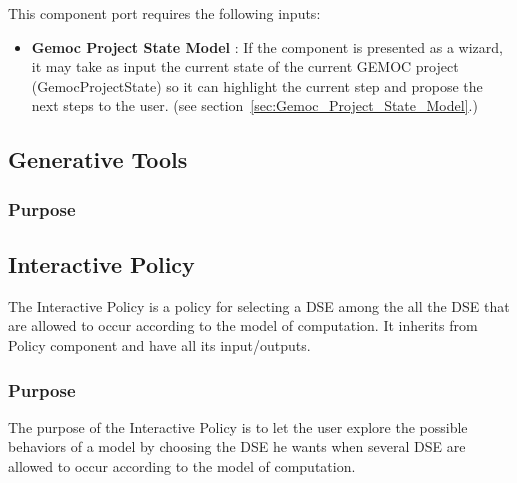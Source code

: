 \documentclass{gemoc} %
\begin{document}
This component port requires the following inputs:
\begin{itemize}
  \item \textbf{Gemoc Project State Model} :
If the component is presented as a wizard, it may take as input the current state of the current GEMOC project (GemocProjectState) so it can highlight the current step and propose the next steps to the user.
(see section~\ref{sec:Gemoc_Project_State_Model}.)
\end{itemize}



\subsection{Generative Tools}
\label{sec:Generative_Tools}


\subsubsection{Purpose}






\subsection{Interactive Policy}
\label{sec:Interactive_Policy}
The Interactive Policy is a policy for selecting a DSE among the all the DSE that are allowed to occur according to the model of computation.
It inherits from Policy component and have all its input/outputs.

\subsubsection{Purpose}
The purpose of the Interactive Policy is to let the user explore the possible behaviors of a model by choosing the DSE he wants when several DSE are allowed to occur according to the model of computation.
\end{document}
